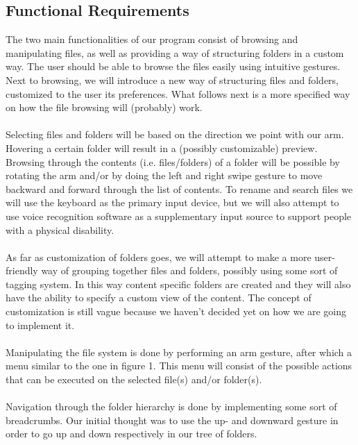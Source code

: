 \documentclass{article}
\begin{document}
\subsection{Functional Requirements}
The two main functionalities of our program consist of browsing and manipulating files, as well as providing a way of structuring folders in a custom way. The user should be able to browse the files easily using intuitive gestures. Next to browsing, we will introduce a new way of structuring files and folders, customized to the user its preferences. What follows next is a more specified way on how the file browsing will (probably) work. 
\\\\
Selecting files and folders will be based on the direction we point with our arm. Hovering a certain folder will result in a (possibly customizable) preview. Browsing through the contents (i.e. files/folders) of a folder will be possible by rotating the arm and/or by doing the left and right swipe gesture to move backward and forward through the list of contents. To rename and search files we will use the keyboard as the primary input device, but we will also attempt to use voice recognition software as a supplementary input source to support people with a physical disability.
\\\\
As far as customization of folders goes, we will attempt to make a more user-friendly way of grouping together files and folders, possibly using some sort of tagging system. In this way content specific folders are created and they will also have the ability to specify a custom view of the content. The concept of customization is still vague because we haven't decided yet on how we are going to implement it.
\\\\
Manipulating the file system is done by performing an arm gesture, after which a menu similar to the one in figure 1. This menu will consist of the possible actions that can be executed on the selected file(s) and/or folder(s).
\\\\
Navigation through the folder hierarchy is done by implementing some sort of breadcrumbs. Our initial thought was to use the  up- and downward gesture in order to go up and down respectively in our tree of folders.
\end{document}
